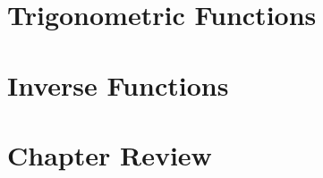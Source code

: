 \documentclass[11pt, letterpaper, oneside]{memoir}
\begin{document}




\section{Trigonometric Functions}

\section{Inverse Functions}

\section{Chapter Review}



\end{document}
